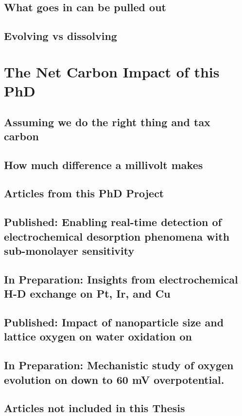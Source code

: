 \documentclass{report}
\begin{document}
\section{What goes in can be pulled out}
\section{Evolving vs dissolving}

\chapter{The Net Carbon Impact of this PhD}
\section{Assuming we do the right thing and tax carbon}
\section{How much difference a millivolt makes}

\begin{appendices}
	\chapter{Articles from this PhD Project}
		\section{Published: Enabling real-time detection of electrochemical desorption phenomena with sub-monolayer sensitivity}
		\section{In Preparation: Insights from electrochemical H-D exchange on Pt, Ir, and Cu}
		\section{Published: Impact of nanoparticle size and lattice oxygen on water oxidation on }
		\section{In Preparation: Mechanistic study of oxygen evolution on  down to 60 mV overpotential.}
		\section{Articles not included in this Thesis}
\end{appendices}
	
\end{document}
